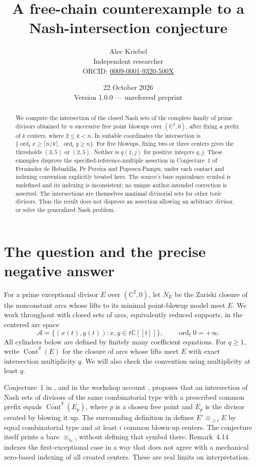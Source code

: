 \documentclass[11pt]{article}
\title{A free-chain counterexample to a Nash-intersection conjecture}
\author{Alec Kriebel\\
\small Independent researcher\\
\small ORCID: \href{https://orcid.org/0009-0001-9320-500X}{0009-0001-9320-500X}}
\date{22 October 2026\\\small Version 1.0.0 --- unrefereed preprint}
\newcommand{\C}{\mathbb C}
\newcommand{\ord}{\operatorname{ord}_t}
\newcommand{\Nash}{\overline N}
\newcommand{\Cont}{\overline{\operatorname{Cont}}}
\newcommand{\A}{\mathcal A}
\begin{document}
\maketitle
\begin{abstract}
We compute the intersection of the closed Nash sets of the complete family
of prime divisors obtained by \(n\) successive free point blowups over
\((\C^2,0)\), after fixing a prefix of \(k\) centers, where \(2\leq k<n\).
In suitable coordinates the intersection is
\(\{\ord x\geq\lceil n/k\rceil,\ \ord y\geq n\}\).
For five blowups, fixing two or three centers gives the thresholds
\((3,5)\) or \((2,5)\). Neither is \(q(1,j)\) for positive integers \(q,j\).
These examples disprove the specified-reference-multiple assertion in
Conjecture~1 of Fern\'andez de Bobadilla, Pe Pereira and Popescu-Pampu,
under each contact and indexing convention explicitly treated here.
The source's bare equivalence symbol is undefined and its indexing is
inconsistent; no unique author-intended correction is asserted.
The intersections are themselves maximal divisorial sets for other
toric divisors. Thus the result does not disprove an assertion allowing
an arbitrary divisor, or solve the generalized Nash problem.
\end{abstract}

\section{The question and the precise negative answer}

For a prime exceptional divisor \(E\) over \((\C^2,0)\), let \(\Nash_E\)
be the Zariski closure of the nonconstant arcs whose lifts to its minimal
point-blowup model meet \(E\). We work throughout with closed sets of arcs,
equivalently reduced supports, in the centered arc space
\[
 \A=\{(x(t),y(t)):x,y\in t\C[[t]]\},\qquad \ord 0=+\infty.
\]
All cylinders below are defined by finitely many coefficient equations.
For \(q\geq1\), write \(\Cont^q(E)\) for the closure of arcs whose lifts
meet \(E\) with exact intersection multiplicity \(q\). We will also check
the convention using multiplicity at least \(q\).

Conjecture~1 in \cite[p.~31]{original}, and in the workshop account
\cite[p.~2679]{workshop}, proposes that an intersection of Nash sets
of divisors of the same combinatorial type with a prescribed common
prefix equals \(\Cont^q(E_p)\), where \(p\) is a chosen free point and
\(E_p\) is the divisor created by blowing it up. The surrounding
definition in \cite[p.~30]{original} defines \(E'\equiv_{\geq i}E\) by
equal combinatorial type and at least \(i\) common blown-up centers.
The conjecture itself prints a bare \(\equiv_{i_0}\), without defining
that symbol there. Remark~4.14 indexes the first-exceptional case in a
way that does not agree with a mechanical zero-based indexing of all
created centers. These are real limits on interpretation.
\end{document}
